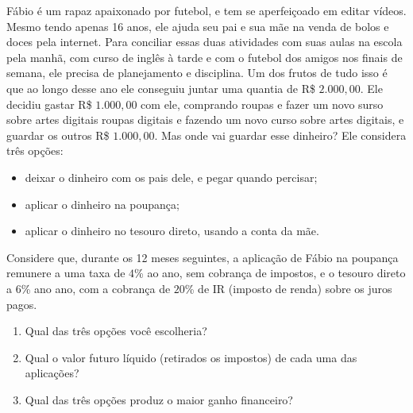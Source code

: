 \begin{task}{}
Fábio é um rapaz apaixonado por futebol, e tem se aperfeiçoado em editar vídeos. Mesmo tendo apenas 16 anos, ele ajuda seu pai e sua mãe na venda de bolos e doces pela internet. Para conciliar essas duas atividades com suas aulas na escola pela manhã, com curso de inglês à tarde e com o futebol dos amigos nos finais de semana, ele precisa de planejamento e disciplina. Um dos frutos de tudo isso é que ao longo desse ano ele conseguiu juntar uma quantia de R\$ $2.000{,}00$. Ele decidiu gastar R\$ $1.000{,}00$ com ele, comprando roupas e fazer um novo surso sobre artes digitais roupas digitais e fazendo um novo curso sobre artes digitais, e guardar os outros R\$ $1.000{,}00$. Mas onde vai guardar esse dinheiro? Ele considera três opções:
\begin{itemize}
  \item deixar o dinheiro com os pais dele, e pegar quando percisar;
  \item aplicar o dinheiro na poupança;
  \item aplicar o dinheiro no tesouro direto, usando a conta da mãe.
\end{itemize}

Considere que, durante os 12 meses seguintes, a aplicação de Fábio na poupança remunere a uma taxa de $4$\% ao ano, sem cobrança de impostos, e o tesouro direto a $6$\% ano ano, com a cobrança de $20$\% de IR (imposto de renda) sobre os juros pagos.

\begin{enumerate}
  \item Qual das três opções você escolheria?
  \item Qual o valor futuro líquido (retirados os impostos) de cada uma das aplicações?
  \item Qual das três opções produz o maior ganho financeiro?
\end{enumerate}
\end{task}



